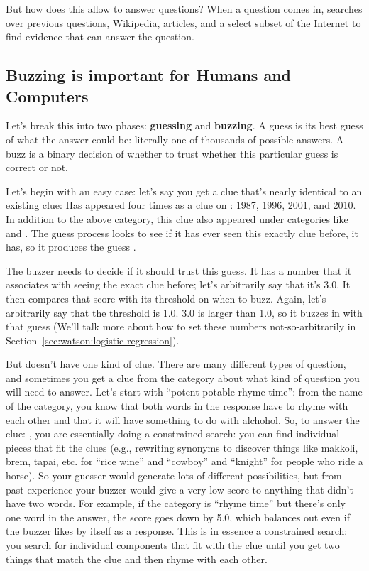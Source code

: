 But how does this allow \watson{} to answer questions?
%
When a question comes in, \watson{} searches over previous \jeopardy{}
questions, Wikipedia, articles, and a select subset of the Internet to find
evidence that can answer the question.

\subsection{Buzzing is important for Humans and Computers}

Let's break this into two phases: {\bf guessing} and {\bf buzzing}.
%
A guess is its best guess of what the answer could be: literally one of
thousands of possible answers.
%
A buzz is a binary decision of whether to trust whether this particular guess
is correct or not.

Let's begin with an easy case: let's say you get a clue that's nearly
identical to an existing clue:
Has appeared four times as a clue on \jeopardy{}: 1987, 1996, 2001, and 2010.
%
In addition to the above category, this clue also appeared under categories like  and .
%
The guess process looks to see if it has ever seen this exactly clue before,
it has, so it produces the guess .

The buzzer needs to decide if it should trust this guess.
%
It has a number that it associates with seeing the exact clue before; let's
arbitrarily say that it's 3.0.  It then compares that score with its threshold
on when to buzz.  Again, let's arbitrarily say that the threshold is 1.0.  3.0
is larger than 1.0, so it buzzes in with that guess (We'll talk more about how to set these numbers not-so-arbitrarily in
Section~\ref{sec:watson:logistic-regression}).

But \jeopardy{} doesn’t have one kind of clue.  There are many different types
of question, and sometimes you get a clue from the category about what kind of
question you will need to answer.  Let’s start with ``potent potable rhyme
time'': from the name of the category, you know that both words in the
response have to rhyme with each other and that it will have something to do
with alchohol.
%
So, to answer the clue:
,
%
you are essentially doing a constrained search: you can find individual pieces
that fit the clues (e.g., rewriting synonyms to discover things like makkoli,
brem, tapai, etc. for ``rice wine'' and ``cowboy'' and ``knight'' for people
who ride a horse).
%
So your guesser would generate lots of different possibilities, but from past
experience your buzzer would give a very low score to anything that didn't
have two words.
%
For example, if the category is ``rhyme time'' but there's only one word in
the answer, the score goes down by 5.0, which balances out even if the buzzer
likes  by itself as a response.
%
This is in essence a
constrained search: you search for individual components that fit with the
clue until you get two things that match the clue and then rhyme with each
other.

